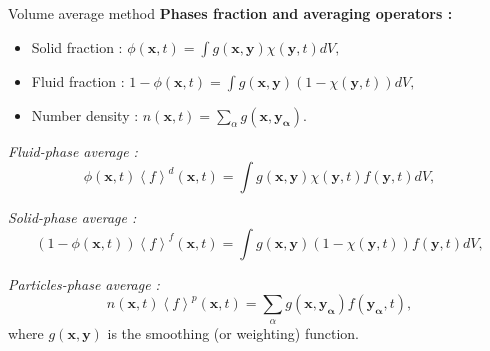 \documentclass[aspectratio=169]{beamer}
\begin{document}
\begin{frame}
  {Volume average method}
  \textbf{Phases fraction and averaging operators : }
  \begin{itemize}
    \item Solid fraction : $\phi(\bm{x},t) = \int g(\bm{x},\bm{y}) \chi(\bm{y},t)dV,$
    \item Fluid fraction : $1 -\phi(\bm{x},t) = \int g(\bm{x},\bm{y}) (1 - \chi(\bm{y},t))dV,$
    \item Number density : $n(\bm{x},t) = \sum_{\alpha} g(\bm{x},\bm{y_\alpha}).$
\end{itemize}

\textit{Fluid-phase average :}
\begin{equation}
  \phi(\bm{x},t)\left<f\right>^d(\bm{x},t) = \int g(\bm{x},\bm{y}) \chi(\bm{y},t) f(\bm{y},t)dV,
  \label{eq:volad}
\end{equation}

\textit{Solid-phase average :}
\begin{equation}
  \label{eq:volaf}
  (1-\phi(\bm{x},t))\left<f\right>^f(\bm{x},t) = \int g(\bm{x},\bm{y}) (1-\chi(\bm{y},t)) f(\bm{y},t)dV,
\end{equation}

\textit{Particles-phase average :}
\begin{equation}
  \label{eq:partia}
  n(\bm{x},t)\left<f\right>^p(\bm{x},t) = \sum_{\alpha} g(\bm{x},\bm{y_\alpha}) f(\bm{y_\alpha},t),
\end{equation}
where $g(\bm{x},\bm{y})$ is the smoothing (or weighting) function.
\end{frame}
\end{document}
